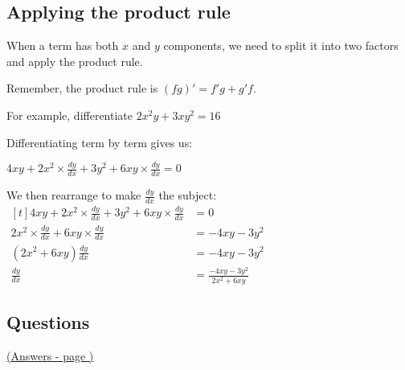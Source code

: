 \documentclass[../main.tex]{subfiles}
\begin{document}
\subsection*{Applying the product rule}
When a term has both \(x\) and \(y\) components, we need to split it into two factors and apply the product rule.

Remember, the product rule is \( (fg)' = f'g +g'f\).

For example, differentiate \(2x^2y+3xy^2=16\)

Differentiating term by term gives us:

\(4xy + 2x^2\times\frac{dy}{dx}+3y^2+6xy\times\frac{dy}{dx}=0\)

We then rearrange to make \(\frac{dy}{dx}\) the subject:
    $
    \!
    \begin{aligned}[t]
     4xy + 2x^2\times\frac{dy}{dx}+3y^2+6xy\times\frac{dy}{dx}
        &= 0 \\
     2x^2\times\frac{dy}{dx}+6xy\times\frac{dy}{dx}
        &= -4xy-3y^2 \\
    (2x^2+6xy)\frac{dy}{dx}
        &= -4xy-3y^2 \\
    \frac{dy}{dx}
        &= \frac{-4xy-3y^2}{2x^2+6xy}
    \end{aligned}
    $

\pagebreak
\hypertarget{implicitdifflink}{\subsection*{Questions}}
\hyperlink{implicitdiffanswers}{(Answers - page {\pageref*{Implicit differentiation answers}})}

\label{Implicit Differentiation}
\end{document}

